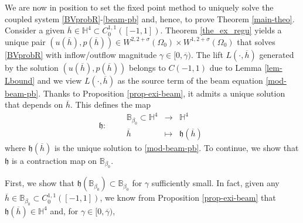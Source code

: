 \documentclass[11pt,a4paper]{amsart}
\theoremstyle{remark}
\theoremstyle{definition}
\numberwithin{equation}{section}
\numberwithin{proposition}{section}
\begin{document}
We are now in position to set the fixed point method to uniquely solve the coupled system \eqref{BVprobR}-\eqref{beam-pb} and, hence, to prove Theorem \ref{main-theo}.
Consider a given $\overline{h}\in  \mathbb{H}^4\subset   C^{1,1}_0([-1,1])$. Theorem \ref{the_ex_regu} yields a unique pair $(u(\overline{h}), p(\overline{h}))\in W^{2, 2+\sigma}(\Omega_0)\times W^{1, 2+\sigma}(\Omega_0)$ that solves \eqref{BVprobR} with inflow/outflow magnitude $\gamma\in [0, \overline{\gamma})$. The lift $L(\cdot, \overline{h})$ generated by the solution $(u(\overline{h}), p(\overline{h}))$  belongs to $C(-1,1)$ due to Lemma \ref{lem-Lbound} and we view $L(\cdot, \overline{h})$ as the source term of the beam equation \eqref{mod-beam-pb}. Thanks to Proposition \ref{prop-exi-beam}, it admits a unique solution that depends on $\overline{h}$. This defines the map
\begin{equation}\label{fixedpoint-map}
   \mathfrak{h} : \qquad  \begin{array}{ccc}
       \mathbb{B}_{\beta_0}\subset \mathbb{H}^4 & \rightarrow & \mathbb{H}^4\\[5pt]
        \overline{h}& \mapsto & \mathfrak{h}(\overline{h})
    \end{array}
\end{equation}
where $\mathfrak{h}(\overline{h})$ is the unique solution to \eqref{mod-beam-pb}. To continue, we show that $\mathfrak{h}$ is a contraction map on $\mathbb{B}_{\beta_0}$.\par
First, we show that $\mathfrak{h}(\mathbb{B}_{\beta_0})\subset \mathbb{B}_{\beta_0}$ for $\gamma$ sufficiently small. In fact, given any $\overline{h}\in \mathbb{B}_{\beta_0}\subset C^{1,1}_0([-1,1])$, we know from Proposition \ref{prop-exi-beam} that $\mathfrak{h}(\overline{h})\in \mathbb{H}^4$ and, for $\gamma\in [0, \overline{\gamma})$,
\end{document}
